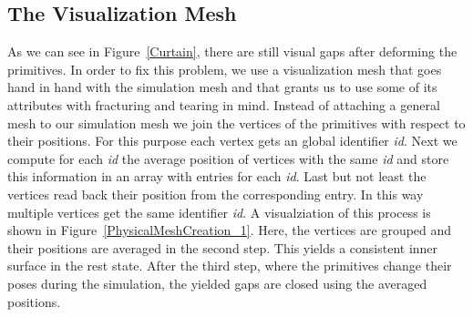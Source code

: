 \documentclass[
	11pt, 
	DIV10,
	a4paper, 
	oneside, 
	headings=normal, 
	captions=tableheading,
	final, 
	numbers=noenddot
]{scrartcl}
\begin{document}
\subsection{The Visualization Mesh}	
	As we can see in Figure~\ref{Curtain}, there are still visual gaps after deforming the primitives. In order to fix this problem, we use a visualization mesh that goes hand in hand with the simulation mesh and that grants us to use some of its attributes with fracturing and tearing in mind. Instead of attaching a general mesh to our simulation mesh we join the vertices of the primitives with respect to their positions. For this purpose each vertex gets an global identifier \textit{id}. Next we compute for each \textit{id} the average position of vertices with the same \textit{id} and store this information in an array with entries for each \textit{id}. Last but not least the vertices read back their position from the corresponding entry. In this way multiple vertices get the same identifier \textit{id}. A visualziation of this process is shown in Figure~\ref{PhysicalMeshCreation_1}. Here, the vertices are grouped and their positions are averaged in the second step. This yields a consistent inner surface in the rest state. After the third step, where the primitives change their poses during the simulation, the yielded gaps are closed using the averaged positions.
\end{document}
